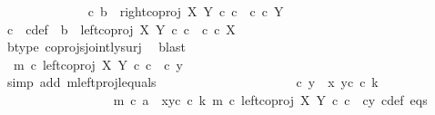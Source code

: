 \begin{isabellebody}
\isanewline
\ \ \ \ \ \ \ \ \ \ \ \ \isamarkupfalse%
\ {\isachardoublequoteopen}{\isasymnexists}c{\isachardot}{\kern0pt}\ b\ {\isacharequal}{\kern0pt}\ right{\isacharunderscore}{\kern0pt}coproj\ X\ Y\ {\isasymcirc}\isactrlsub c\ c\ {\isasymand}\ c\ {\isasymin}\isactrlsub c\ Y{\isachardoublequoteclose}\isanewline
\ \ \ \ \ \ \ \ \ \ \ \ \isamarkupfalse%
\ \isamarkupfalse%
\ c\ \ c{\isacharunderscore}{\kern0pt}def{\isacharcolon}{\kern0pt}\ \ {\isachardoublequoteopen}b\ {\isacharequal}{\kern0pt}\ left{\isacharunderscore}{\kern0pt}coproj\ X\ Y\ {\isasymcirc}\isactrlsub c\ c\ {\isasymand}\ c\ {\isasymin}\isactrlsub c\ X{\isachardoublequoteclose}\isanewline
\ \ \ \ \ \ \ \ \ \ \ \ \ \ \isamarkupfalse%
\ b{\isacharunderscore}{\kern0pt}type\ coprojs{\isacharunderscore}{\kern0pt}jointly{\isacharunderscore}{\kern0pt}surj\ \isamarkupfalse%
\ blast\isanewline
\ \ \ \ \ \ \ \ \ \ \ \ \isamarkupfalse%
\ \isamarkupfalse%
\ \ {\isachardoublequoteopen}m\ {\isasymcirc}\isactrlsub c\ left{\isacharunderscore}{\kern0pt}coproj\ X\ Y\ {\isasymcirc}\isactrlsub c\ c\ {\isacharequal}{\kern0pt}\ {\isasymlangle}c{\isacharcomma}{\kern0pt}\ y{}{\isasymrangle}{\isachardoublequoteclose}\isanewline
\ \ \ \ \ \ \ \ \ \ \ \ \ \ \isamarkupfalse%
\ {\isacharparenleft}{\kern0pt}simp\ add{\isacharcolon}{\kern0pt}\ m{\isacharunderscore}{\kern0pt}leftproj{\isacharunderscore}{\kern0pt}l{\isacharunderscore}{\kern0pt}equals{\isacharparenright}{\kern0pt}\ \ \ \ \ \ \isanewline
\ \ \ \ \ \ \ \ \ \ \ \ \isamarkupfalse%
\ \isamarkupfalse%
\ {\isachardoublequoteopen}{\isasymlangle}c{\isacharcomma}{\kern0pt}\ y{}{\isasymrangle}\ {\isacharequal}{\kern0pt}\ {\isasymlangle}x{}{\isacharcomma}{\kern0pt}\ y{}\isactrlsup c\ {\isasymcirc}\isactrlsub c\ k{\isasymrangle}{\isachardoublequoteclose}\isanewline
\ \ \ \ \ \ \ \ \ \ \ \ \ \ \ \ \isamarkupfalse%
\ {\isacartoucheopen}m\ {\isasymcirc}\isactrlsub c\ a\ {\isacharequal}{\kern0pt}\ {\isasymlangle}x{}{\isacharcomma}{\kern0pt}y{}\isactrlsup c\ {\isasymcirc}\isactrlsub c\ k{\isasymrangle}{\isacartoucheclose}\ {\isacartoucheopen}m\ {\isasymcirc}\isactrlsub c\ left{\isacharunderscore}{\kern0pt}coproj\ X\ Y\ {\isasymcirc}\isactrlsub c\ c\ {\isacharequal}{\kern0pt}\ {\isasymlangle}c{\isacharcomma}{\kern0pt}y{}{\isasymrangle}{\isacartoucheclose}\ c{\isacharunderscore}{\kern0pt}def\ eqs\ \isamarkupfalse%

\end{isabellebody}
